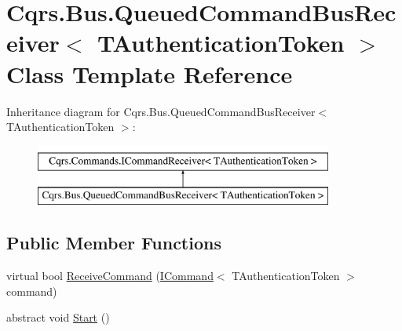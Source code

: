 \hypertarget{classCqrs_1_1Bus_1_1QueuedCommandBusReceiver}{}\section{Cqrs.\+Bus.\+Queued\+Command\+Bus\+Receiver$<$ T\+Authentication\+Token $>$ Class Template Reference}
\label{classCqrs_1_1Bus_1_1QueuedCommandBusReceiver}
Inheritance diagram for Cqrs.\+Bus.\+Queued\+Command\+Bus\+Receiver$<$ T\+Authentication\+Token $>$\+:\begin{figure}[H]
\begin{center}
\leavevmode
\includegraphics[height=2.000000cm]{classCqrs_1_1Bus_1_1QueuedCommandBusReceiver}
\end{center}
\end{figure}
\subsection*{Public Member Functions}
\begin{DoxyCompactItemize}
\item 
virtual bool \hyperlink{classCqrs_1_1Bus_1_1QueuedCommandBusReceiver_aad9ab381afcc8346479ab9cabdf1046a}{Receive\+Command} (\hyperlink{interfaceCqrs_1_1Commands_1_1ICommand}{I\+Command}$<$ T\+Authentication\+Token $>$ command)
\item 
abstract void \hyperlink{classCqrs_1_1Bus_1_1QueuedCommandBusReceiver_ad8bf3c1f9d9b0444cb85784cb9e59823}{Start} ()
\end{DoxyCompactItemize}

